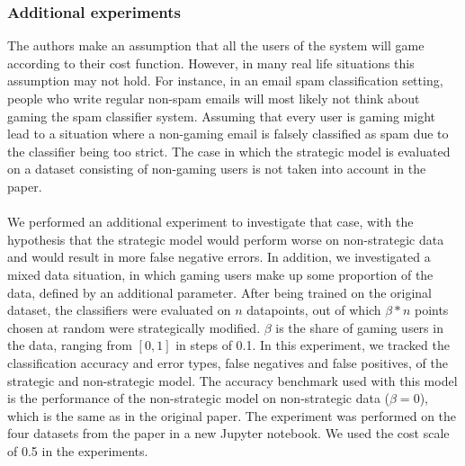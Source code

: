 \subsubsection{Additional experiments} 
The authors make an assumption that all the users of the system will game according to their cost function. However, in many real life situations this assumption may not hold. For instance, in an email spam classification setting, people who write regular non-spam emails will most likely not think about gaming the spam classifier system. Assuming that every user is gaming might lead to a situation where a non-gaming email is falsely classified as spam due to the classifier being too strict. The case in which the strategic model is evaluated on a dataset consisting of non-gaming users is not taken into account in the paper. \\ \\
We performed an additional experiment to investigate that case, with the hypothesis that the strategic model would perform worse on non-strategic data and would result in more false negative errors. In addition, we investigated a mixed data situation, in which gaming users make up some proportion of the data, defined by an additional parameter. After being trained on the original dataset, the classifiers were evaluated on $n$ datapoints, out of which $\beta * n$  points chosen at random were strategically modified. $\beta$ is the share of  gaming users in the data, ranging from $[0, 1]$ in steps of 0.1.  In this experiment, we tracked the classification accuracy and error types, false negatives and false positives, of the strategic and non-strategic model. The accuracy benchmark used with this model is the performance of the non-strategic model on non-strategic data ($\beta = 0$), which is the same as in the original paper. The experiment was performed on the four datasets from the paper in a new Jupyter notebook. We used the cost scale of 0.5 in the experiments.
 

